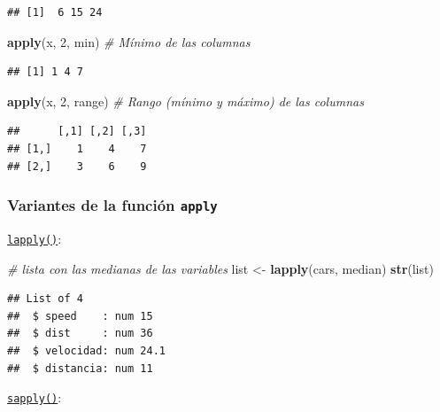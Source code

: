 \documentclass[]{book}
\newenvironment{Shaded}{\begin{snugshade}}{\end{snugshade}}
\newcommand{\KeywordTok}[1]{\textcolor[rgb]{0.13,0.29,0.53}{\textbf{#1}}}
\newcommand{\DecValTok}[1]{\textcolor[rgb]{0.00,0.00,0.81}{#1}}
\newcommand{\StringTok}[1]{\textcolor[rgb]{0.31,0.60,0.02}{#1}}
\newcommand{\CommentTok}[1]{\textcolor[rgb]{0.56,0.35,0.01}{\textit{#1}}}
\newcommand{\NormalTok}[1]{#1}
\begin{document}
\begin{verbatim}
## [1]  6 15 24
\end{verbatim}

\begin{Shaded}
\begin{Highlighting}[]
\KeywordTok{apply}\NormalTok{(x, }\DecValTok{2}\NormalTok{, min)    }\CommentTok{# Mínimo de las columnas}
\end{Highlighting}
\end{Shaded}

\begin{verbatim}
## [1] 1 4 7
\end{verbatim}

\begin{Shaded}
\begin{Highlighting}[]
\KeywordTok{apply}\NormalTok{(x, }\DecValTok{2}\NormalTok{, range)  }\CommentTok{# Rango (mínimo y máximo) de las columnas}
\end{Highlighting}
\end{Shaded}

\begin{verbatim}
##      [,1] [,2] [,3]
## [1,]    1    4    7
## [2,]    3    6    9
\end{verbatim}

\subsubsection{\texorpdfstring{Variantes de la función
\texttt{apply}}{Variantes de la función apply}}\label{variantes-de-la-funcion-apply}

\href{https://www.rdocumentation.org/packages/base/versions/3.6.1/topics/lapply}{\texttt{lapply()}}:

\begin{Shaded}
\begin{Highlighting}[]
\CommentTok{# lista con las medianas de las variables}
\NormalTok{list <-}\StringTok{ }\KeywordTok{lapply}\NormalTok{(cars, median)}
\KeywordTok{str}\NormalTok{(list)}
\end{Highlighting}
\end{Shaded}

\begin{verbatim}
## List of 4
##  $ speed    : num 15
##  $ dist     : num 36
##  $ velocidad: num 24.1
##  $ distancia: num 11
\end{verbatim}

\href{https://www.rdocumentation.org/packages/base/versions/3.6.1/topics/sapply}{\texttt{sapply()}}:
\end{document}

